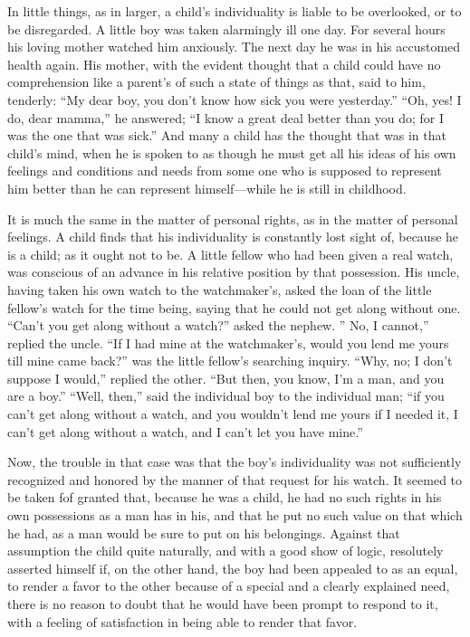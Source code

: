 \documentclass[
]{book}
\begin{document}
In little things, as in larger, a child's individuality is liable to be overlooked, or to be disregarded. A little boy was taken alarmingly ill one day. For several hours his loving mother watched him anxiously. The next day he was in his accustomed health again. His mother, with the evident thought that a child could have no comprehension like a parent's of such a state of things as that, said to him, tenderly: ``My dear boy, you don't know how sick you were yesterday.'' ``Oh, yes! I do, dear mamma,'' he answered; ``I know a great deal better than you do; for I was the one that was sick.'' And many a child has the thought that was in that child's mind, when he is spoken to as though he must get all his ideas of his own feelings and conditions and needs from some one who is supposed to represent him better than he can represent himself---while he is still in childhood.

It is much the same in the matter of personal rights, as in the matter of personal feelings. A child finds that his individuality is constantly lost sight of, because he is a child; as it ought not to be. A little fellow who had been given a real watch, was conscious of an advance in his relative position by that possession. His uncle, having taken his own watch to the watchmaker's, asked the loan of the little fellow's watch for the time being, saying that he could not get along without one. ``Can't you get along without a watch?'' asked the nephew. '' No, I cannot,'' replied the uncle. ``If I had mine at the watchmaker's, would you lend me yours till mine came back?'' was the little fellow's searching inquiry. ``Why, no; I don't suppose I would,'' replied the other. ``But then, you know, I'm a man, and you are a boy.'' ``Well, then,'' said the individual boy to the individual man; ``if you can't get along without a watch, and you wouldn't lend me yours if I needed it, I can't get along without a watch, and I can't let you have mine.''

Now, the trouble in that case was that the boy's individuality was not sufficiently recognized and honored by the manner of that request for his watch. It seemed to be taken fof granted that, because he was a child, he had no such rights in his own possessions as a man has in his, and that he put no such value on that which he had, as a man would be sure to put on his belongings. Against that assumption the child quite naturally, and with a good show of logic, resolutely asserted himself if, on the other hand, the boy had been appealed to as an equal, to render a favor to the other because of a special and a clearly explained need, there is no reason to doubt that he would have been prompt to respond to it, with a feeling of satisfaction in being able to render that favor.
\end{document}
